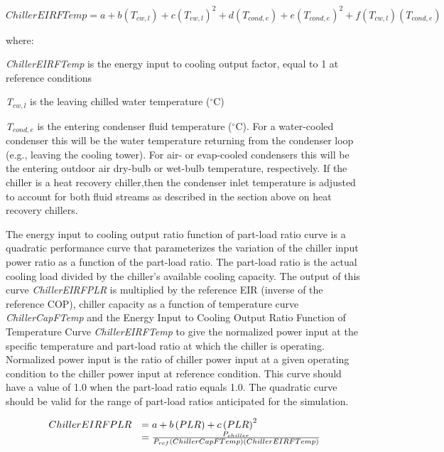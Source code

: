 \begin{equation}
ChillerEIRFTemp = a + b\left( {{T_{cw,l}}} \right) + c{\left( {{T_{cw,l}}} \right)^2} + d\left( {{T_{cond,e}}} \right) + e{\left( {{T_{cond,e}}} \right)^2} + f\left( {{T_{cw,l}}} \right)\left( {{T_{cond,e}}} \right)
\end{equation}

where:

\emph{ChillerEIRFTemp} is the energy input to cooling output factor, equal to 1 at reference conditions

\emph{T\(_{cw,l}\)} is the leaving chilled water temperature (\(^{\circ}\)C)

\emph{T\(_{cond,e}\)} is the entering condenser fluid temperature (\(^{\circ}\)C). For a water-cooled condenser this will be the water temperature returning from the condenser loop (e.g., leaving the cooling tower). For air- or evap-cooled condensers this will be the entering outdoor air dry-bulb or wet-bulb temperature, respectively. If the chiller is a heat recovery chiller,then the condenser inlet temperature is adjusted to account for both fluid streams as described in the section above on heat recovery chillers.

The energy input to cooling output ratio function of part-load ratio curve is a quadratic performance curve that parameterizes the variation of the chiller input power ratio as a function of the part-load ratio. The part-load ratio is the actual cooling load divided by the chiller's available cooling capacity. The output of this curve \textit{ChillerEIRFPLR} is multiplied by the reference EIR (inverse of the reference COP), chiller capacity as a function of temperature curve \textit{ChillerCapFTemp} and the Energy Input to Cooling Output Ratio Function of Temperature Curve \textit{ChillerEIRFTemp} to give the normalized power input at the specific temperature and part-load ratio at which the chiller is operating. Normalized power input is the ratio of chiller power input at a given operating condition to the chiller power input at reference condition. This curve should have a value of 1.0 when the part-load ratio equals 1.0. The quadratic curve should be valid for the range of part-load ratios anticipated for the simulation.

\begin{equation}
  \begin{array}{rl}
    ChillerEIRFPLR &= a + b\left(PLR\right) + c\left(PLR\right)^2\\
                   &= \frac{P_{chiller}}{{P_{ref}}\left( {ChillerCapFTemp} \right)\left( {ChillerEIRFTemp} \right)}
  \end{array}
\end{equation}


